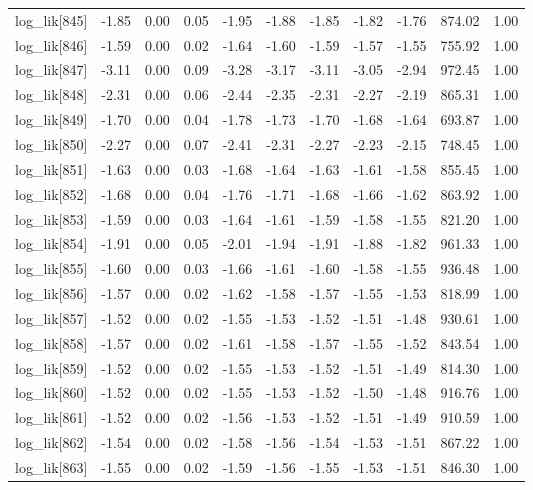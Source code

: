 \begin{table}[ht]
\begin{tabular}{rrrrrrrrrrr}
  log\_lik[845] & -1.85 & 0.00 & 0.05 & -1.95 & -1.88 & -1.85 & -1.82 & -1.76 & 874.02 & 1.00 \\ 
  log\_lik[846] & -1.59 & 0.00 & 0.02 & -1.64 & -1.60 & -1.59 & -1.57 & -1.55 & 755.92 & 1.00 \\ 
  log\_lik[847] & -3.11 & 0.00 & 0.09 & -3.28 & -3.17 & -3.11 & -3.05 & -2.94 & 972.45 & 1.00 \\ 
  log\_lik[848] & -2.31 & 0.00 & 0.06 & -2.44 & -2.35 & -2.31 & -2.27 & -2.19 & 865.31 & 1.00 \\ 
  log\_lik[849] & -1.70 & 0.00 & 0.04 & -1.78 & -1.73 & -1.70 & -1.68 & -1.64 & 693.87 & 1.00 \\ 
  log\_lik[850] & -2.27 & 0.00 & 0.07 & -2.41 & -2.31 & -2.27 & -2.23 & -2.15 & 748.45 & 1.00 \\ 
  log\_lik[851] & -1.63 & 0.00 & 0.03 & -1.68 & -1.64 & -1.63 & -1.61 & -1.58 & 855.45 & 1.00 \\ 
  log\_lik[852] & -1.68 & 0.00 & 0.04 & -1.76 & -1.71 & -1.68 & -1.66 & -1.62 & 863.92 & 1.00 \\ 
  log\_lik[853] & -1.59 & 0.00 & 0.03 & -1.64 & -1.61 & -1.59 & -1.58 & -1.55 & 821.20 & 1.00 \\ 
  log\_lik[854] & -1.91 & 0.00 & 0.05 & -2.01 & -1.94 & -1.91 & -1.88 & -1.82 & 961.33 & 1.00 \\ 
  log\_lik[855] & -1.60 & 0.00 & 0.03 & -1.66 & -1.61 & -1.60 & -1.58 & -1.55 & 936.48 & 1.00 \\ 
  log\_lik[856] & -1.57 & 0.00 & 0.02 & -1.62 & -1.58 & -1.57 & -1.55 & -1.53 & 818.99 & 1.00 \\ 
  log\_lik[857] & -1.52 & 0.00 & 0.02 & -1.55 & -1.53 & -1.52 & -1.51 & -1.48 & 930.61 & 1.00 \\ 
  log\_lik[858] & -1.57 & 0.00 & 0.02 & -1.61 & -1.58 & -1.57 & -1.55 & -1.52 & 843.54 & 1.00 \\ 
  log\_lik[859] & -1.52 & 0.00 & 0.02 & -1.55 & -1.53 & -1.52 & -1.51 & -1.49 & 814.30 & 1.00 \\ 
  log\_lik[860] & -1.52 & 0.00 & 0.02 & -1.55 & -1.53 & -1.52 & -1.50 & -1.48 & 916.76 & 1.00 \\ 
  log\_lik[861] & -1.52 & 0.00 & 0.02 & -1.56 & -1.53 & -1.52 & -1.51 & -1.49 & 910.59 & 1.00 \\ 
  log\_lik[862] & -1.54 & 0.00 & 0.02 & -1.58 & -1.56 & -1.54 & -1.53 & -1.51 & 867.22 & 1.00 \\ 
  log\_lik[863] & -1.55 & 0.00 & 0.02 & -1.59 & -1.56 & -1.55 & -1.53 & -1.51 & 846.30 & 1.00 \\ 

\end{tabular}
\end{table}
